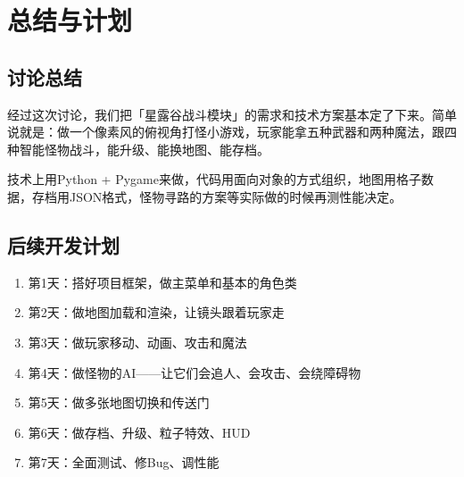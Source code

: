 \documentclass[12pt,a4paper]{article}
\begin{document}
\section{总结与计划}

\subsection{讨论总结}

经过这次讨论，我们把「星露谷战斗模块」的需求和技术方案基本定了下来。简单说就是：做一个像素风的俯视角打怪小游戏，玩家能拿五种武器和两种魔法，跟四种智能怪物战斗，能升级、能换地图、能存档。

技术上用Python + Pygame来做，代码用面向对象的方式组织，地图用格子数据，存档用JSON格式，怪物寻路的方案等实际做的时候再测性能决定。

\subsection{后续开发计划}

\begin{enumerate}[leftmargin=2em]
    \item 第1天：搭好项目框架，做主菜单和基本的角色类
    \item 第2天：做地图加载和渲染，让镜头跟着玩家走
    \item 第3天：做玩家移动、动画、攻击和魔法
    \item 第4天：做怪物的AI——让它们会追人、会攻击、会绕障碍物
    \item 第5天：做多张地图切换和传送门
    \item 第6天：做存档、升级、粒子特效、HUD
    \item 第7天：全面测试、修Bug、调性能
\end{enumerate}
\end{document}
